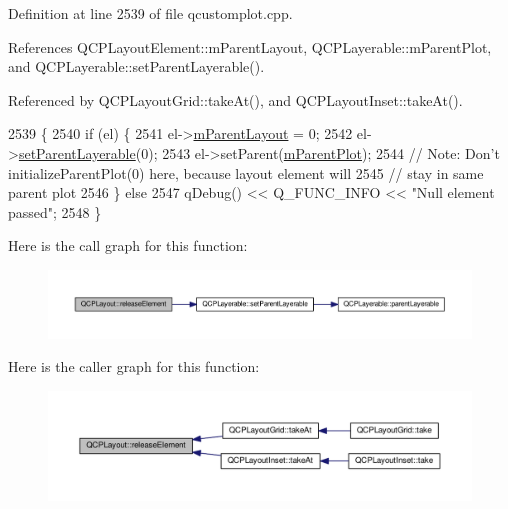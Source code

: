 Definition at line 2539 of file qcustomplot.\+cpp.



References Q\+C\+P\+Layout\+Element\+::m\+Parent\+Layout, Q\+C\+P\+Layerable\+::m\+Parent\+Plot, and Q\+C\+P\+Layerable\+::set\+Parent\+Layerable().



Referenced by Q\+C\+P\+Layout\+Grid\+::take\+At(), and Q\+C\+P\+Layout\+Inset\+::take\+At().


\begin{DoxyCode}
2539                                                    \{
2540   \textcolor{keywordflow}{if} (el) \{
2541     el->\hyperlink{class_q_c_p_layout_element_ae7c75c25549608bd688bdb65d4c38066}{mParentLayout} = 0;
2542     el->\hyperlink{class_q_c_p_layerable_aa23c893671f1f6744ac235cf2204cf3a}{setParentLayerable}(0);
2543     el->setParent(\hyperlink{class_q_c_p_layerable_aa2a528433e44db02b8aef23c1f9f90ed}{mParentPlot});
2544     \textcolor{comment}{// Note: Don't initializeParentPlot(0) here, because layout element will}
2545     \textcolor{comment}{// stay in same parent plot}
2546   \} \textcolor{keywordflow}{else}
2547     qDebug() << Q\_FUNC\_INFO << \textcolor{stringliteral}{"Null element passed"};
2548 \}
\end{DoxyCode}


Here is the call graph for this function\+:\nopagebreak
\begin{figure}[H]
\begin{center}
\leavevmode
\includegraphics[width=350pt]{class_q_c_p_layout_a4afbb4bef0071f72f91afdac4433a18e_cgraph}
\end{center}
\end{figure}




Here is the caller graph for this function\+:\nopagebreak
\begin{figure}[H]
\begin{center}
\leavevmode
\includegraphics[width=350pt]{class_q_c_p_layout_a4afbb4bef0071f72f91afdac4433a18e_icgraph}
\end{center}
\end{figure}



